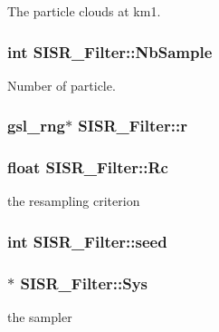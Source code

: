 The particle clouds at km1. 

\hypertarget{class_s_i_s_r___filter_6fc6faef959558a07d6a6a6ead140eac}{
\subsubsection[{NbSample}]{\setlength{\rightskip}{0pt plus 5cm}int {\bf SISR\_\-Filter::NbSample}}}
\label{class_s_i_s_r___filter_6fc6faef959558a07d6a6a6ead140eac}


Number of particle. 

\hypertarget{class_s_i_s_r___filter_3ff0a8a77b5651e779606cb52a07ae9d}{
\subsubsection[{r}]{\setlength{\rightskip}{0pt plus 5cm}gsl\_\-rng$\ast$ {\bf SISR\_\-Filter::r}}}
\label{class_s_i_s_r___filter_3ff0a8a77b5651e779606cb52a07ae9d}


\hypertarget{class_s_i_s_r___filter_ef137d325c5bc000e33fe4d7c4d53347}{
\subsubsection[{Rc}]{\setlength{\rightskip}{0pt plus 5cm}float {\bf SISR\_\-Filter::Rc}}}
\label{class_s_i_s_r___filter_ef137d325c5bc000e33fe4d7c4d53347}


the resampling criterion 

\hypertarget{class_s_i_s_r___filter_aefe1be49175842bd0bd115e0f2dd647}{
\subsubsection[{seed}]{\setlength{\rightskip}{0pt plus 5cm}int {\bf SISR\_\-Filter::seed}}}
\label{class_s_i_s_r___filter_aefe1be49175842bd0bd115e0f2dd647}


\hypertarget{class_s_i_s_r___filter_2dec4b493576d6bbb1b59c267e910d1a}{
\subsubsection[{Sys}]{$\ast$ {\bf SISR\_\-Filter::Sys}}}
\label{class_s_i_s_r___filter_2dec4b493576d6bbb1b59c267e910d1a}


the sampler 


